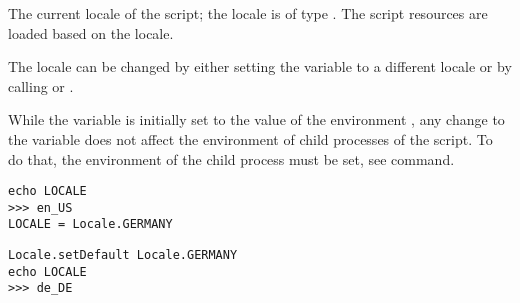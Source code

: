 %

The current locale of the script; the locale is of 
type \cite{locale13}. The script resources 
are loaded based on the locale. 

The locale can be changed by either setting the variable to
a different locale or by calling 
 or
.

While the  variable is initially set to the value of the environment
, any change to the \cite{posixenviron13} variable does not affect the
environment of child processes of the script. To do that, the environment of
the child process must be set, see  command.

\begin{lstlisting}[style=Groovybash, label={lst:example_variable_pwd}, title={
Change the locale by using the variable.}]
echo LOCALE
>>> en_US
LOCALE = Locale.GERMANY
\end{lstlisting}

\begin{lstlisting}[style=Groovybash, label={lst:example_variable_pwd}, title={
Change the locale by using the static method.}]
Locale.setDefault Locale.GERMANY
echo LOCALE
>>> de_DE
\end{lstlisting}

